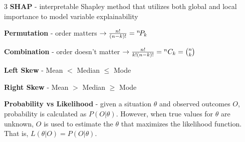 \documentclass[10pt,landscape]{article}
\begin{document}
\begin{multicols}{3}
\textbf{SHAP} - interpretable Shapley method that utilizes both global and local importance to model variable explainability

\textbf{Permutation} - order matters  $\to \frac{n!}{(n-k)!} = {}^{n}\!P_{k}$

\textbf{Combination} - order doesn't matter $\to \frac{n!}{k!(n-k)!}= {}^{n}C_{k}= \binom nk$

\textbf{Left Skew} - Mean $<$ Median $\leq$ Mode

\textbf{Right Skew} - Mean $>$ Median $\geq$ Mode

\textbf{Probability vs Likelihood} - given a situation $\theta$ and observed outcomes $O$, probability is calculated as $P(O|\theta)$. However, when true values for $\theta$ are unknown, $O$ is used to estimate the $\theta$ that maximizes the likelihood function. That is, $L(\theta|O) = P(O|\theta)$.
\newpage
\end{multicols}
\end{document}
